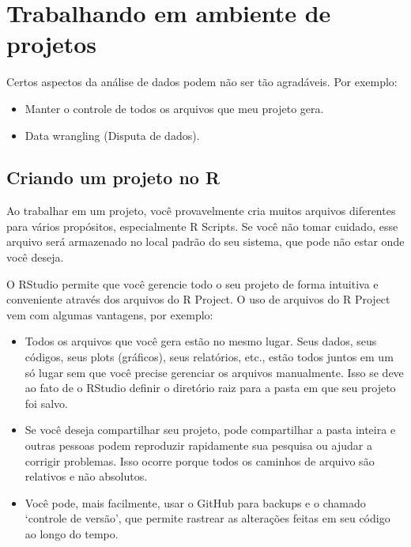\documentclass[
]{book}
\providecommand{\tightlist}{%
  \setlength{\itemsep}{0pt}\setlength{\parskip}{0pt}}
\begin{document}
\hypertarget{trabalhando-em-ambiente-de-projetos}{%
\chapter{Trabalhando em ambiente de projetos}\label{trabalhando-em-ambiente-de-projetos}}

Certos aspectos da análise de dados podem não ser tão agradáveis. Por exemplo:

\begin{itemize}
\tightlist
\item
  Manter o controle de todos os arquivos que meu projeto gera.
\item
  Data wrangling (Disputa de dados).
\end{itemize}

\hypertarget{criando-um-projeto-no-r}{%
\section{Criando um projeto no R}\label{criando-um-projeto-no-r}}

Ao trabalhar em um projeto, você provavelmente cria muitos arquivos diferentes para vários propósitos, especialmente R Scripts. Se você não tomar cuidado, esse arquivo será armazenado no local padrão do seu sistema, que pode não estar onde você deseja.

O RStudio permite que você gerencie todo o seu projeto de forma intuitiva e conveniente através dos arquivos do R Project. O uso de arquivos do R Project vem com algumas vantagens, por exemplo:

\begin{itemize}
\item
  Todos os arquivos que você gera estão no mesmo lugar. Seus dados, seus códigos, seus plots (gráficos), seus relatórios, etc., estão todos juntos em um só lugar sem que você precise gerenciar os arquivos manualmente. Isso se deve ao fato de o RStudio definir o diretório raiz para a pasta em que seu projeto foi salvo.
\item
  Se você deseja compartilhar seu projeto, pode compartilhar a pasta inteira e outras pessoas podem reproduzir rapidamente sua pesquisa ou ajudar a corrigir problemas. Isso ocorre porque todos os caminhos de arquivo são relativos e não absolutos.
\item
  Você pode, mais facilmente, usar o GitHub para backups e o chamado `controle de versão', que permite rastrear as alterações feitas em seu código ao longo do tempo.
\end{itemize}
\end{document}

